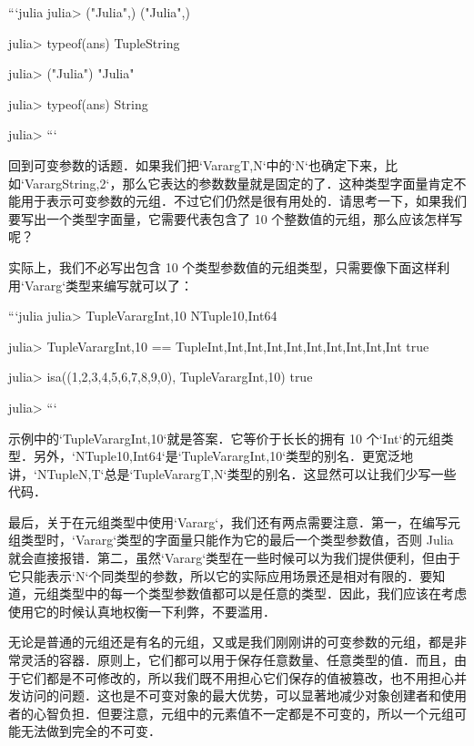 ```julia
julia> ("Julia",)
("Julia",)

julia> typeof(ans)
Tuple{String}

julia> ("Julia")
"Julia"

julia> typeof(ans)
String

julia> 
```

回到可变参数的话题．如果我们把`Vararg{T,N}`中的`N`也确定下来，比如`Vararg{String,2}`，那么它表达的参数数量就是固定的了．这种类型字面量肯定不能用于表示可变参数的元组．不过它们仍然是很有用处的．请思考一下，如果我们要写出一个类型字面量，它需要代表包含了 10 个整数值的元组，那么应该怎样写呢？

实际上，我们不必写出包含 10 个类型参数值的元组类型，只需要像下面这样利用`Vararg`类型来编写就可以了：

```julia
julia> Tuple{Vararg{Int,10}}
NTuple{10,Int64}

julia> Tuple{Vararg{Int,10}} == Tuple{Int,Int,Int,Int,Int,Int,Int,Int,Int,Int}
true

julia> isa((1,2,3,4,5,6,7,8,9,0), Tuple{Vararg{Int,10}})
true

julia> 
```

示例中的`Tuple{Vararg{Int,10}}`就是答案．它等价于长长的拥有 10 个`Int`的元组类型．另外，`NTuple{10,Int64}`是`Tuple{Vararg{Int,10}}`类型的别名．更宽泛地讲，`NTuple{N,T}`总是`Tuple{Vararg{T,N}}`类型的别名．这显然可以让我们少写一些代码．

最后，关于在元组类型中使用`Vararg`，我们还有两点需要注意．第一，在编写元组类型时，`Vararg`类型的字面量只能作为它的最后一个类型参数值，否则 Julia 就会直接报错．第二，虽然`Vararg`类型在一些时候可以为我们提供便利，但由于它只能表示`N`个同类型的参数，所以它的实际应用场景还是相对有限的．要知道，元组类型中的每一个类型参数值都可以是任意的类型．因此，我们应该在考虑使用它的时候认真地权衡一下利弊，不要滥用．

无论是普通的元组还是有名的元组，又或是我们刚刚讲的可变参数的元组，都是非常灵活的容器．原则上，它们都可以用于保存任意数量、任意类型的值．而且，由于它们都是不可修改的，所以我们既不用担心它们保存的值被篡改，也不用担心并发访问的问题．这也是不可变对象的最大优势，可以显著地减少对象创建者和使用者的心智负担．但要注意，元组中的元素值不一定都是不可变的，所以一个元组可能无法做到完全的不可变．